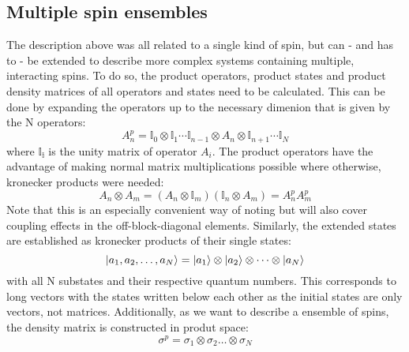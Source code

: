         \subsection{Multiple spin ensembles}
            The description above was all related to a single kind of spin, but can - and has to - be extended to describe more complex systems containing multiple, interacting spins. To do so, the product operators, product states and product density matrices of all operators and states need to be calculated. This can be done by expanding the operators up to the necessary dimenion that is given by the N operators:
            \begin{equation*}
                A^p_n = \mathbb{I}_0\otimes\mathbb{I}_1\cdots \mathbb{I}_{n-1} \otimes A_n \otimes \mathbb{I}_{n+1}\cdots \mathbb{I}_N
            \end{equation*}
            where $\mathbb{I_i}$ is the unity matrix of operator $A_i$. The product operators have the advantage of making normal matrix multiplications possible where otherwise, kronecker products were needed:
            \begin{equation}
                A_n\otimes A_m = (A_n \otimes \mathbb{I}_m)(\mathbb{I}_n \otimes A_m) = A^p_nA^p_m
            \end{equation}
            Note that this is an especially convenient way of noting but will also cover coupling effects in the off-block-diagonal elements. Similarly, the extended states are established as kronecker products of their single states:
            \begin{equation}
                \ket{a_1,a_2, \dots, a_N} = \ket{a_1}\otimes\ket{a_2}\otimes\dots\otimes\ket{a_N}
            \end{equation}
            with all N substates and their respective quantum numbers. This corresponds to long vectors with the states written below each other as the initial states are only vectors, not matrices.
            Additionally, as we want to describe a ensemble of spins, the density matrix is constructed in produt space:
            \begin{equation}
                \sigma^p = \sigma_1 \otimes\sigma_2\dots\otimes\sigma_N
            \end{equation}
